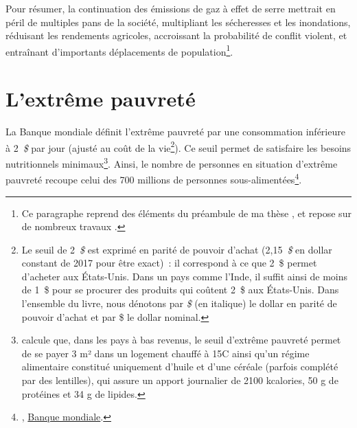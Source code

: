 \documentclass[a5paper,french,openany]{memoir}
\begin{document}
Pour résumer, la continuation des émissions de gaz à effet de serre mettrait en péril de multiples pans de la société, multipliant les sécheresses et les inondations, réduisant les rendements agricoles, accroissant la probabilité de conflit violent, et entraînant d'importants déplacements de population\footnote{Ce paragraphe reprend des éléments du préambule de ma thèse \citep{fabre_is_2020}, et repose sur de nombreux travaux \citep{cattaneo_human_2019,carleton_social_2016,dell_temperature_2012}.}. 


\section{L'extrême pauvreté} %

La Banque mondiale définit l'extrême pauvreté par une consommation inférieure à 2~\textit{\$} par jour (ajusté au coût de la vie\footnote{Le seuil de 2~\textit{\$} est exprimé en parité de pouvoir d'achat (2,15~\textit{\$} en dollar constant de 2017 pour être exact)~: il correspond à ce que 2~\$ permet d'acheter aux États-Unis. Dans un pays comme l'Inde, il suffit ainsi de moins de 1~\$ pour se procurer des produits qui coûtent 2~\$ aux États-Unis. Dans l'ensemble du livre, nous dénotons par \textit{\$} (en italique) le dollar en parité de pouvoir d'achat et par \$ le dollar nominal.}). %
Ce seuil permet de satisfaire les besoins nutritionnels minimaux\footnote{\citet{allen_absolute_2017-1} calcule que, dans les pays à bas revenus, le seuil d'extrême pauvreté permet de se payer 3 m² dans un logement chauffé à 15\textdegree{}C ainsi qu'un régime alimentaire constitué uniquement d'huile et d'une céréale (parfois complété par des lentilles), qui assure un apport journalier de 2100 kcalories, 50 g de protéines et 34 g de lipides.}. Ainsi, le nombre de personnes en situation d'extrême pauvreté recoupe celui des 700 millions de personnes sous-alimentées\footnote{\citet{fao_state_2023}, \href{https://data.worldbank.org/indicator/SI.POV.DDAY?end=2019&locations=MW-1W&start=1990&view=chart}{Banque mondiale}.}. 
\end{document}
